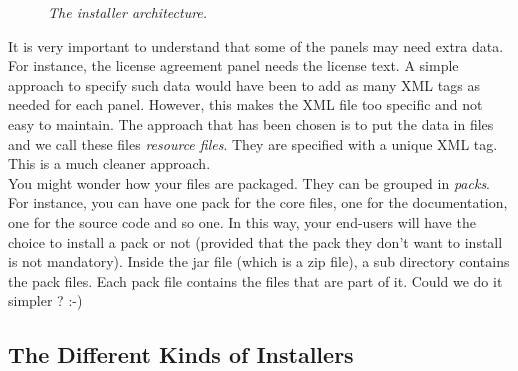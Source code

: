 \begin{figure}[h]
\caption{\label{archinstaller}
         \textit{The installer architecture.}}
\begin{center}
\end{center}
\end{figure}

It is very important to understand that some of the panels may need extra data. For
instance, the license agreement panel needs the license text. A simple approach
to specify such data would have been to add as many XML tags as needed for
each panel. However, this makes the XML file too specific and not easy to
maintain. The approach that has been chosen is to put the data in files and we
call these files \textit{resource files}. They are specified with a unique XML
tag. This is a much cleaner approach.\\

You might wonder how your files are packaged. They can be grouped in
\textit{packs}. For instance, you can have one pack for the core files, one for
the documentation, one for the source code and so one. In this way, your end-users
will have the choice to install a pack or not (provided that the pack they don't
want to install is not mandatory). Inside the jar file (which is a zip file), a
sub directory contains the pack files. Each pack file contains the files that are
part of it. Could we do it simpler ? :-)\\

\subsection{The Different Kinds of Installers}

